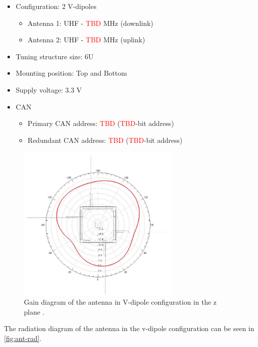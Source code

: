 \begin{itemize}
    \item Configuration: 2 V-dipoles 
        \begin{itemize}
            \item Antenna 1: UHF - \textcolor{red}{TBD} MHz (downlink)
            \item Antenna 2: UHF - \textcolor{red}{TBD} MHz (uplink)
        \end{itemize}
    \item Tuning structure size: 6U
    \item Mounting position: Top and Bottom
    \item Supply voltage: 3.3 V
    \item CAN 
        \begin{itemize}
            \item Primary CAN address: \textcolor{red}{TBD} (\textcolor{red}{TBD}-bit address)
            \item Redundant CAN address: \textcolor{red}{TBD} (\textcolor{red}{TBD}-bit address)
        \end{itemize}
\end{itemize}

\begin{figure}[!ht]
    \begin{center}
        \includegraphics[width=0.7\textwidth]{figures/subsystems/sat_2drad_dipv_z.jpg}
        \caption{ Gain diagram of the antenna in V-dipole configuration in the z plane \cite{ant-rad}.}
        \label{fig:ant-rad}
    \end{center}
\end{figure}

The radiation diagram of the antenna in the v-dipole configuration can be seen in \autoref{fig:ant-rad}.


